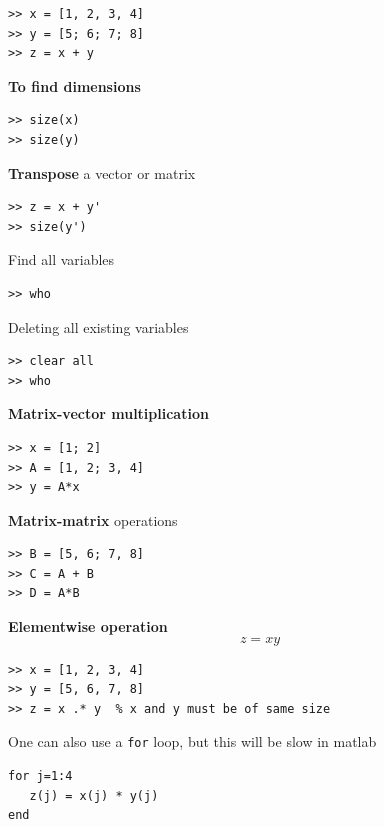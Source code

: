 \documentclass[11pt,xcolor=svgnames,onlymath]{beamer}
\begin{document}
\begin{frame}
\begin{lstlisting}
>> x = [1, 2, 3, 4]
>> y = [5; 6; 7; 8]
>> z = x + y
\end{lstlisting}

\vspace{2mm}

{\bf To find dimensions}
\begin{lstlisting}
>> size(x)
>> size(y)
\end{lstlisting}

\vspace{2mm}

{\bf Transpose} a vector or matrix
\begin{lstlisting}
>> z = x + y'
>> size(y')
\end{lstlisting}

\vspace{2mm}

Find all variables
\begin{lstlisting}
>> who
\end{lstlisting}

\vspace{2mm}

Deleting all existing variables
\begin{lstlisting}
>> clear all
>> who
\end{lstlisting}

\pagebreak

{\bf Matrix-vector multiplication}
\begin{lstlisting}
>> x = [1; 2]
>> A = [1, 2; 3, 4]
>> y = A*x
\end{lstlisting}

\vspace{2mm}

{\bf Matrix-matrix} operations
\begin{lstlisting}
>> B = [5, 6; 7, 8]
>> C = A + B
>> D = A*B
\end{lstlisting}

\vspace{2mm}

{\bf Elementwise operation}
\[
z = x y
\]
\begin{lstlisting}
>> x = [1, 2, 3, 4]
>> y = [5, 6, 7, 8]
>> z = x .* y  % x and y must be of same size
\end{lstlisting}
One can also use a {\tt for} loop, but this will be slow in matlab
\begin{lstlisting}
for j=1:4
   z(j) = x(j) * y(j)
end
\end{lstlisting}


\end{frame}
\end{document}

